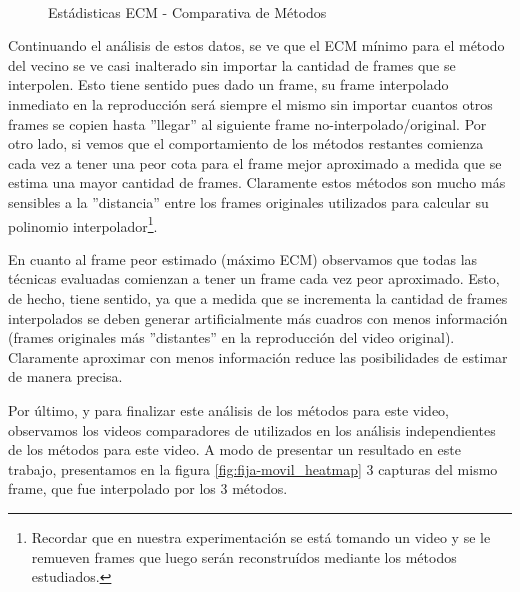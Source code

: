 \begin{figure}[H]
    \centering
    \\
    \caption{Est\'adisticas ECM - Comparativa de M\'etodos}
    \label{fig:fija-movil_methods-mse_estadisticas}
\end{figure}

\par Continuando el an\'alisis de estos datos, se ve que el ECM m\'inimo para
el m\'etodo del vecino se ve casi inalterado sin importar la cantidad de frames
que se interpolen. Esto tiene sentido pues dado un frame, su frame interpolado
inmediato en la reproducci\'on ser\'a siempre el mismo sin importar cuantos
otros frames se copien hasta ''llegar'' al siguiente frame
no-interpolado/original. Por otro lado, si vemos que el comportamiento de los
m\'etodos restantes comienza cada vez a tener una peor cota para el frame mejor
aproximado a medida que se estima una mayor cantidad de frames. Claramente
estos m\'etodos son mucho m\'as sensibles a la ''distancia'' entre los frames
originales utilizados para calcular su polinomio interpolador\footnote{Recordar
que en nuestra experimentaci\'on se est\'a tomando un video y se le remueven
frames que luego ser\'an reconstru\'idos mediante los m\'etodos estudiados.}.

\par En cuanto al frame peor estimado (m\'aximo ECM) observamos que todas las
t\'ecnicas evaluadas comienzan a tener un frame cada vez peor aproximado. Esto,
de hecho, tiene sentido, ya que a medida que se incrementa la cantidad de
frames interpolados se deben generar artificialmente m\'as cuadros con menos
informaci\'on (frames originales m\'as ''distantes'' en la reproducci\'on del
video original). Claramente aproximar con menos informaci\'on reduce las
posibilidades de estimar de manera precisa.

\par Por \'ultimo, y para finalizar este an\'alisis de los m\'etodos para este
video, observamos los videos comparadores de utilizados en los an\'alisis
independientes de los m\'etodos para este video. A modo de presentar un resultado
en este trabajo, presentamos en la figura \ref{fig:fija-movil_heatmap} 3
capturas del mismo frame, que fue interpolado por los 3 m\'etodos.

